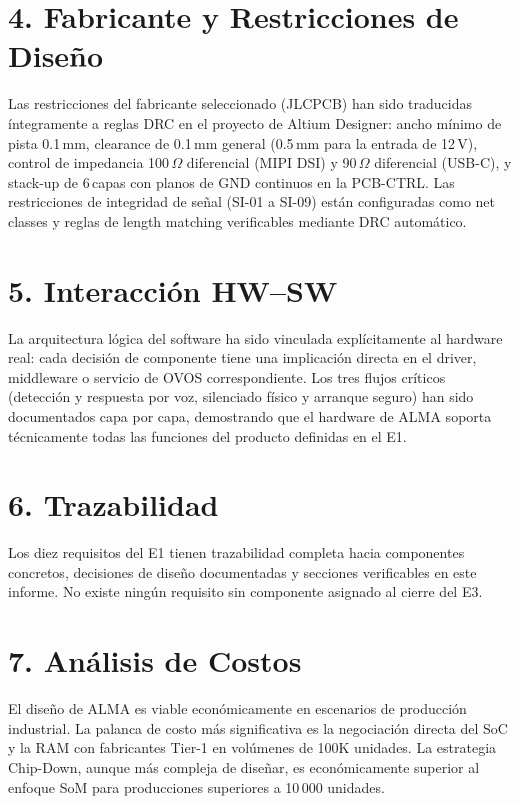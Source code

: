 \section{4. Fabricante y Restricciones de Diseño}

Las restricciones del fabricante seleccionado (JLCPCB) han sido traducidas íntegramente a reglas DRC en el proyecto de Altium Designer: ancho mínimo de pista 0.1\,mm, clearance de 0.1\,mm general (0.5\,mm para la entrada de 12\,V), control de impedancia 100\,$\Omega$ diferencial (MIPI DSI) y 90\,$\Omega$ diferencial (USB-C), y stack-up de 6\,capas con planos de GND continuos en la PCB-CTRL. Las restricciones de integridad de señal (SI-01 a SI-09) están configuradas como net classes y reglas de length matching verificables mediante DRC automático.

\section{5. Interacción HW--SW}

La arquitectura lógica del software ha sido vinculada explícitamente al hardware real: cada decisión de componente tiene una implicación directa en el driver, middleware o servicio de OVOS correspondiente. Los tres flujos críticos (detección y respuesta por voz, silenciado físico y arranque seguro) han sido documentados capa por capa, demostrando que el hardware de ALMA soporta técnicamente todas las funciones del producto definidas en el E1.

\section{6. Trazabilidad}

Los diez requisitos del E1 tienen trazabilidad completa hacia componentes concretos, decisiones de diseño documentadas y secciones verificables en este informe. No existe ningún requisito sin componente asignado al cierre del E3.

\section{7. Análisis de Costos}

El diseño de ALMA es viable económicamente en escenarios de producción industrial. La palanca de costo más significativa es la negociación directa del SoC y la RAM con fabricantes Tier-1 en volúmenes de 100K unidades. La estrategia Chip-Down, aunque más compleja de diseñar, es económicamente superior al enfoque SoM para producciones superiores a 10\,000 unidades.

